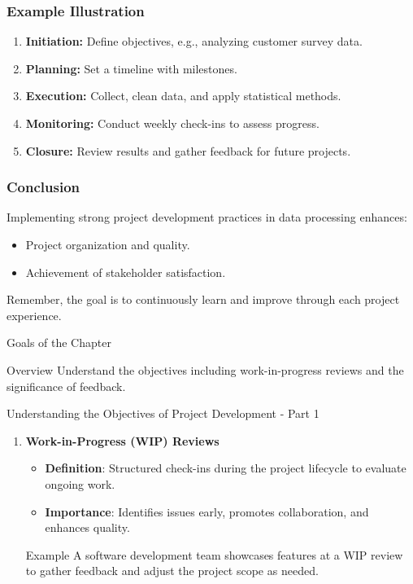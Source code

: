 \documentclass[aspectratio=169]{beamer}
\begin{document}
\begin{frame}[fragile]
    \frametitle{Example Illustration}
    \begin{enumerate}
        \item \textbf{Initiation:} Define objectives, e.g., analyzing customer survey data.
        \item \textbf{Planning:} Set a timeline with milestones.
        \item \textbf{Execution:} Collect, clean data, and apply statistical methods.
        \item \textbf{Monitoring:} Conduct weekly check-ins to assess progress.
        \item \textbf{Closure:} Review results and gather feedback for future projects.
    \end{enumerate}
\end{frame}

\begin{frame}[fragile]
    \frametitle{Conclusion}
    Implementing strong project development practices in data processing enhances:
    \begin{itemize}
        \item Project organization and quality.
        \item Achievement of stakeholder satisfaction.
    \end{itemize}
    Remember, the goal is to continuously learn and improve through each project experience.
\end{frame}

\begin{frame}[fragile]{Goals of the Chapter}
    \begin{block}{Overview}
        Understand the objectives including work-in-progress reviews and the significance of feedback.
    \end{block}
\end{frame}

\begin{frame}[fragile]{Understanding the Objectives of Project Development - Part 1}
    \begin{enumerate}
        \item \textbf{Work-in-Progress (WIP) Reviews}
        \begin{itemize}
            \item \textbf{Definition}: Structured check-ins during the project lifecycle to evaluate ongoing work.
            \item \textbf{Importance}: Identifies issues early, promotes collaboration, and enhances quality.
        \end{itemize}
        
        \begin{block}{Example}
            A software development team showcases features at a WIP review to gather feedback and adjust the project scope as needed.
        \end{block}
    \end{enumerate}
\end{frame}
\end{document}
